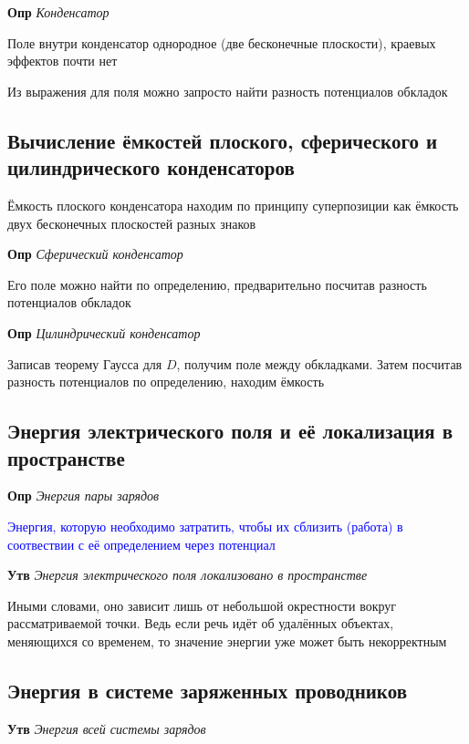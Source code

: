 \documentclass[a4paper, 14pt]{article}
\begin{document}
    \textbf{Опр} \textit{Конденсатор}
    
    Поле внутри конденсатор однородное (две бесконечные плоскости), краевых эффектов почти нет
    
    Из выражения для поля можно запросто найти разность потенциалов обкладок
    
    \subsection{Вычисление ёмкостей плоского, сферического и цилиндрического конденсаторов}
    
    Ёмкость плоского конденсатора находим по принципу суперпозиции как ёмкость двух бесконечных плоскостей разных знаков
    
    \textbf{Опр} \textit{Сферический конденсатор}
    
    Его поле можно найти по определению, предварительно посчитав разность потенциалов обкладок
    
    \textbf{Опр} \textit{Цилиндрический конденсатор}
    
    Записав теорему Гаусса для $D$, получим поле между обкладками.
    Затем посчитав разность потенциалов по определению, находим ёмкость
    
    \subsection{Энергия электрического поля и её локализация в пространстве}
    
    \textbf{Опр} \textit{Энергия пары зарядов}
    
    \textcolor{blue}{Энергия, которую необходимо затратить, чтобы их сблизить (работа) в соотвествии с её
    определением через потенциал}
    
    \textbf{Утв} \textit{Энергия электрического поля локализовано в пространстве}
    
    Иными словами, оно зависит лишь от небольшой окрестности вокруг рассматриваемой точки.
    Ведь если речь идёт об удалённых объектах, меняющихся со временем, то значение энергии уже может быть некорректным
    
    \subsection{Энергия в системе заряженных проводников}
    
    \textbf{Утв} \textit{Энергия всей системы зарядов}
    
\end{document}
